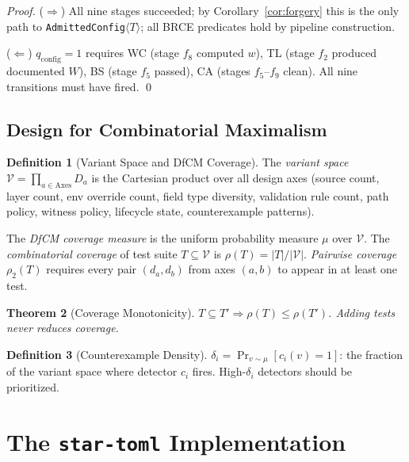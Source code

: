 \documentclass[12pt, letterpaper]{report}
\theoremstyle{plain}
\newtheorem{theorem}{Theorem}[chapter]
\theoremstyle{definition}
\newtheorem{definition}[theorem]{Definition}
\theoremstyle{remark}
\newcommand{\VV}{\mathcal{V}}
\newcommand{\qc}{q_{\mathrm{config}}}
\newcommand{\abs}[1]{\left\lvert #1 \right\rvert}
\begin{document}
\begin{proof}
($\Rightarrow$) All nine stages succeeded; by Corollary~\ref{cor:forgery}
this is the only path to \texttt{AdmittedConfig}$\langle T\rangle$;
all BRCE predicates hold by pipeline construction.

($\Leftarrow$) $\qc = 1$ requires WC (stage $f_8$ computed $w$),
TL (stage $f_2$ produced documented $W$), BS (stage $f_5$ passed),
CA (stages $f_5$--$f_9$ clean). All nine transitions must have fired. \qed
\end{proof}

\section{Design for Combinatorial Maximalism}
\label{sec:dfcm}

\begin{definition}[Variant Space and DfCM Coverage]
\label{def:dfcm}
The \emph{variant space} $\VV = \prod_{a \in \text{Axes}} D_a$ is the
Cartesian product over all design axes (source count, layer count,
env override count, field type diversity, validation rule count,
path policy, witness policy, lifecycle state, counterexample patterns).

The \emph{DfCM coverage measure} is the uniform probability measure $\mu$
over $\VV$. The \emph{combinatorial coverage} of test suite $T \subseteq \VV$
is $\rho(T) = \abs{T}/\abs{\VV}$.
\emph{Pairwise coverage} $\rho_2(T)$ requires every pair $(d_a, d_b)$
from axes $(a, b)$ to appear in at least one test.
\end{definition}

\begin{theorem}[Coverage Monotonicity]
$T \subseteq T' \Rightarrow \rho(T) \leq \rho(T')$.
Adding tests never reduces coverage.
\end{theorem}

\begin{definition}[Counterexample Density]
$\delta_i = \Pr_{v \sim \mu}[c_i(v) = 1]$: the fraction of the variant
space where detector $c_i$ fires. High-$\delta_i$ detectors should be
prioritized.
\end{definition}

\chapter{The \texttt{star-toml} Implementation}
\label{ch:implementation}
\end{document}
